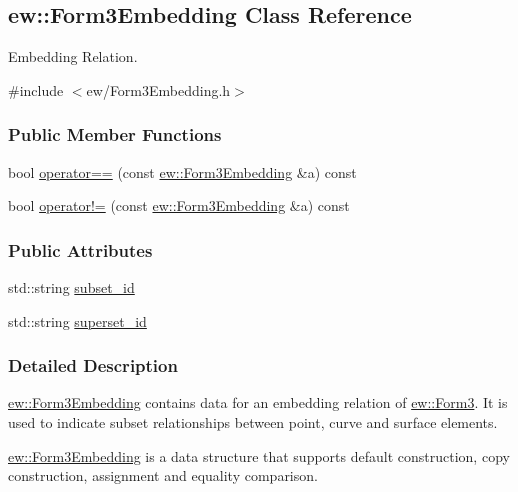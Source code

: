 \hypertarget{classew_1_1Form3Embedding}{
\subsection{ew::Form3Embedding Class Reference}
\label{classew_1_1Form3Embedding}
}


Embedding Relation.  




{\ttfamily \#include $<$ew/Form3Embedding.h$>$}

\subsubsection*{Public Member Functions}
\begin{DoxyCompactItemize}
\item 
bool \hyperlink{classew_1_1Form3Embedding_a1b9eaea828e8bda6225c2133cc869c8c}{operator==} (const \hyperlink{classew_1_1Form3Embedding}{ew::Form3Embedding} \&a) const 
\item 
bool \hyperlink{classew_1_1Form3Embedding_a5a11376b179cf636358a2ea5ef91e13c}{operator!=} (const \hyperlink{classew_1_1Form3Embedding}{ew::Form3Embedding} \&a) const 
\end{DoxyCompactItemize}
\subsubsection*{Public Attributes}
\begin{DoxyCompactItemize}
\item 
std::string \hyperlink{classew_1_1Form3Embedding_a80d00799de7bebf48c00d6cd264a656e}{subset\_\-id}
\item 
std::string \hyperlink{classew_1_1Form3Embedding_a8aff0a6b37b54d177c15abfca9191f67}{superset\_\-id}
\end{DoxyCompactItemize}


\subsubsection{Detailed Description}
\hyperlink{classew_1_1Form3Embedding}{ew::Form3Embedding} contains data for an embedding relation of \hyperlink{classew_1_1Form3}{ew::Form3}. It is used to indicate subset relationships between point, curve and surface elements.

\hyperlink{classew_1_1Form3Embedding}{ew::Form3Embedding} is a data structure that supports default construction, copy construction, assignment and equality comparison. 

